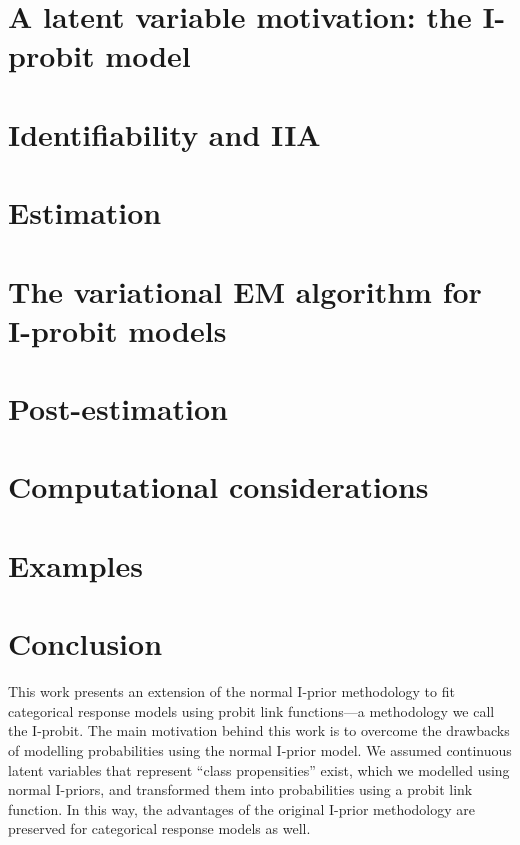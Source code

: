 \documentclass[showframe,11pt,twoside,openright]{report}
\begin{document}
\section{A latent variable motivation: the I-probit model}


\section{Identifiability and IIA}\label{sec:iia}


\section{Estimation}


\section{The variational EM algorithm for I-probit models}\label{sec:iprobitvar}


\section{Post-estimation}\label{sec:iprobitpostest}


\section{Computational considerations}


\section{Examples}
\label{sec:iprobiteg}


\section{Conclusion}

This work presents an extension of the normal I-prior methodology to fit categorical response models using probit link functions---a methodology we call the I-probit.
The main motivation behind this work is to overcome the drawbacks of modelling probabilities using the normal I-prior model.
We assumed continuous latent variables that represent ``class propensities'' exist, which we modelled using normal I-priors, and transformed them into probabilities using a probit link function.
In this way, the advantages of the original I-prior methodology are preserved for categorical response models as well.
\end{document}
